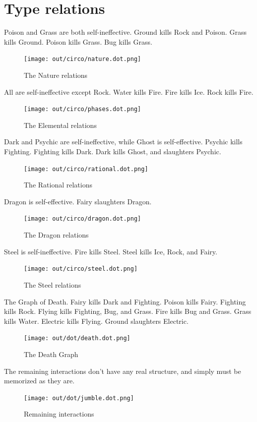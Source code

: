 \section{Type relations}
Poison and Grass are both self-ineffective.
Ground kills Rock and Poison.
Grass kills Ground.
Poison kills Grass.
Bug kills Grass.
\begin{figure}[h]
\centering
\texttt{[image: out/circo/nature.dot.png]}
\caption{The Nature relations}
\end{figure}

All are self-ineffective except Rock.
Water kills Fire.
Fire kills Ice.
Rock kills Fire.
\begin{figure}[h]
\centering
\texttt{[image: out/circo/phases.dot.png]}
\caption{The Elemental relations}
\end{figure}

Dark and Psychic are self-ineffective, while Ghost is self-effective.
Psychic kills Fighting.
Fighting kills Dark.
Dark kills Ghost, and slaughters Psychic.
\begin{figure}[h]
\centering
\texttt{[image: out/circo/rational.dot.png]}
\caption{The Rational relations}
\end{figure}

Dragon is self-effective.
Fairy slaughters Dragon.
\begin{figure}
\centering
\texttt{[image: out/circo/dragon.dot.png]}
\caption{The Dragon relations}
\end{figure}

Steel is self-ineffective.
Fire kills Steel.
Steel kills Ice, Rock, and Fairy.
\begin{figure}
\centering
\texttt{[image: out/circo/steel.dot.png]}
\caption{The Steel relations}
\end{figure}

The Graph of Death.
Fairy kills Dark and Fighting.
Poison kills Fairy.
Fighting kills Rock.
Flying kills Fighting, Bug, and Grass.
Fire kills Bug and Grass.
Grass kills Water.
Electric kills Flying.
Ground slaughters Electric.
\begin{figure}[h]
\centering
\texttt{[image: out/dot/death.dot.png]}
\caption{The Death Graph}
\end{figure}

The remaining interactions don't have any real structure, and simply must be
memorized as they are.
\begin{figure}[h]
\centering
\texttt{[image: out/dot/jumble.dot.png]}
\caption{Remaining interactions}
\end{figure}
